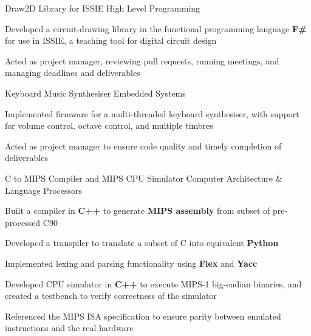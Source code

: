 

\begin{cvprojects}


  \cvproject
  {Draw2D Library for ISSIE} %
  {High Level Programming} %
  { %
      \begin{cvitems}
          \item {Developed a circuit-drawing library in the functional programming language \textbf{F\#} for use in ISSIE, a teaching tool for digital circuit design}%
          \item Acted as project manager, reviewing pull requests, running meetings, and managing deadlines and deliverables
      \end{cvitems}
  }

  \cvproject
  {Keyboard Music Synthesiser} %
  {Embedded Systems} %
  { %
      \begin{cvitems}
          \item {Implemented firmware for a multi-threaded keyboard synthesiser, with support for volume control, octave control, and multiple timbres}
          \item Acted as project manager to ensure code quality and timely completion of deliverables
      \end{cvitems}
  }

  \cvproject
  {C to MIPS Compiler and MIPS CPU Simulator}
  {Computer Architecture \& Language Processors}
  {
      \begin{cvitems}
          \item Built a compiler in \textbf{C++} to generate \textbf{MIPS assembly} from subset of pre-processed C90
          \item Developed a transpiler to translate a subset of C into equivalent \textbf{Python}
          \item Implemented lexing and parsing functionality using \textbf{Flex} and \textbf{Yacc}
          \item Developed CPU simulator in \textbf{C++} to execute MIPS-1 big-endian binaries, and created a testbench to verify correctness of the simulator
        \item Referenced the MIPS ISA specification to ensure parity between emulated instructions and the real hardware
    \end{cvitems}
}


\end{cvprojects}
